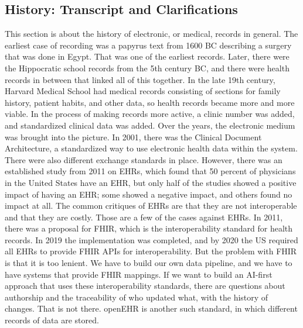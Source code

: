 \documentclass[sigconf]{acmart}
\begin{document}
\subsection{History: Transcript and Clarifications}
This section is about the history of electronic, or medical, records in
general. The earliest case of recording was a papyrus text from 1600 BC
describing a surgery that was done in Egypt. That was one of the earliest
records. Later, there were the Hippocratic school records from the 5th century
BC, and there were health records in between that linked all of this together.
In the late 19th century, Harvard Medical School had medical records
consisting of sections for family history, patient habits, and other data, so
health records became more and more viable. In the process of making records
more active, a clinic number was added, and standardized clinical data was
added. Over the years, the electronic medium was brought into the picture. In
2001, there was the Clinical Document Architecture, a standardized way to use
electronic health data within the system. There were also different exchange
standards in place. However, there was an established study from 2011 on EHRs,
which found that 50 percent of physicians in the United States have an EHR,
but only half of the studies showed a positive impact of having an EHR; some
showed a negative impact, and others found no impact at all. The common
critiques of EHRs are that they are not interoperable and that they are
costly. Those are a few of the cases against EHRs. In 2011, there was a
proposal for FHIR, which is the interoperability standard for health records.
In 2019 the implementation was completed, and by 2020 the US required all EHRs
to provide FHIR APIs for interoperability. But the problem with FHIR is that it
is too lenient. We have to build our own data pipeline, and we have to have
systems that provide FHIR mappings. If we want to build an AI-first approach
that uses these interoperability standards, there are questions about
authorship and the traceability of who updated what, with the history of
changes. That is not there. openEHR is another such standard, in which
different records of data are stored.
\end{document}
